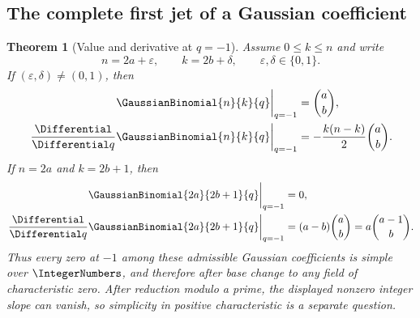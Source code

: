 \documentclass[11pt,oneside]{article}
\newtheorem{theorem}{Theorem}[section]
\theoremstyle{definition}
\theoremstyle{remark}
\newcommand{\eps}{\varepsilon}
\let\reportsubsection\subsection
\let\section\reportsubsection
\begin{document}
\section{The complete first jet of a Gaussian coefficient}

\begin{theorem}[Value and derivative at $q=-1$]\label{thm:gaussian-minus-one-jet}
Assume $0\leq k\leq n$ and write
\[
 n=2a+\eps,
 \qquad k=2b+\delta,
 \qquad \eps,\delta\in\{0,1\}.
\]
If $(\eps,\delta)\ne(0,1)$, then
\begin{align}
 \GaussianBinomial{n}{k}{q}\bigg|_{q=-1}&=\binom ab,\label{eq:minus-one-value-nonzero}\\
 \left.\frac{\Differential}{\Differential q}\GaussianBinomial{n}{k}{q}\right|_{q=-1}
 &=-\frac{k(n-k)}2\binom ab.\label{eq:minus-one-der-nonzero}
\end{align}
If $n=2a$ and $k=2b+1$, then
\begin{align}
 \GaussianBinomial{2a}{2b+1}{q}\bigg|_{q=-1}&=0,\label{eq:minus-one-value-zero}\\
 \left.\frac{\Differential}{\Differential q}\GaussianBinomial{2a}{2b+1}{q}\right|_{q=-1}
 &=(a-b)\binom ab
 =a\binom{a-1}{b}.                                  \label{eq:minus-one-der-zero}
\end{align}
Thus every zero at $-1$ among these admissible Gaussian coefficients is
simple over $\IntegerNumbers$, and therefore after base change to any field of
characteristic zero.  After reduction modulo a prime, the displayed nonzero
integer slope can vanish, so simplicity in positive characteristic is a
separate question.
\end{theorem}
\end{document}
